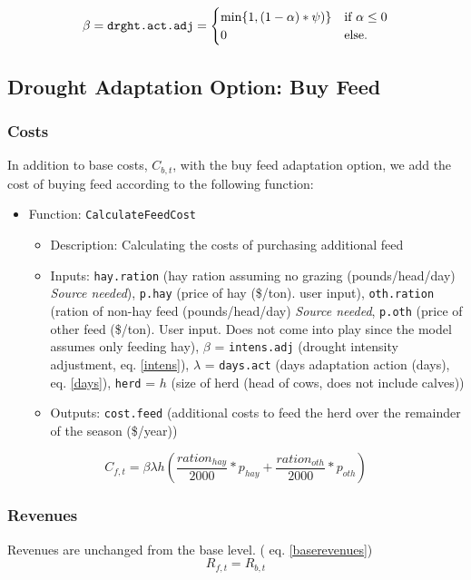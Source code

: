 \documentclass[11pt]{article}
\begin{document}
\begin{equation} \label{intens}
\beta = \verb!drght.act.adj!=
\begin{cases}
\min\{1,(1-\alpha)*\psi)\} & \text{if}\ \alpha \le 0 \\
0 & \text{else}.
\end{cases}
\end{equation}


\subsection{Drought Adaptation Option: Buy Feed}
\subsubsection{Costs}
In addition to base costs, $C_{b,t}$, with the buy feed adaptation option, we add the cost of buying feed according to the following function:
\begin{itemize}
\item Function: \verb!CalculateFeedCost!
	\begin{itemize}
	\item Description: Calculating the costs of purchasing additional feed
	\item Inputs: \verb!hay.ration! (hay ration assuming no grazing (pounds/head/day) \textit{Source needed}), \verb!p.hay! (price of hay (\$/ton). user input), \verb!oth.ration! (ration of non-hay feed (pounds/head/day) \textit{Source needed}, \verb!p.oth! (price of other feed (\$/ton). User input. Does not come into play since the model assumes only feeding hay), $\beta$ = \verb!intens.adj! (drought intensity adjustment, eq. \ref{intens}), $\lambda$ = \verb!days.act! (days adaptation action (days), eq. \ref{days}), \verb!herd! = \(h\) (size of herd (head of cows, does not include calves))
	\item Outputs: \verb!cost.feed! (additional costs to feed the herd over the remainder of the season (\$/year))
	\end{itemize}
\end{itemize}

\begin{equation}
C_{f,t} = \beta \lambda h \left(\frac{ration_{hay}}{2000} * p_{hay} + \frac{ration_{oth}}{2000} * p_{oth} \right)
\end{equation}

\subsubsection{Revenues}
Revenues are unchanged from the base level. ( eq. \ref{baserevenues})
\begin{equation}
R_{f,t} = R_{b,t}
\end{equation}
\end{document}
